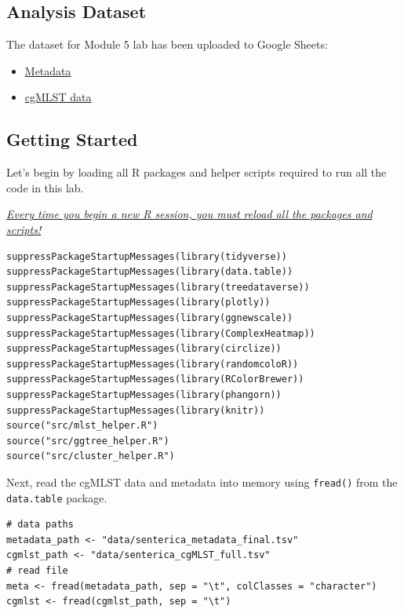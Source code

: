 \documentclass[
]{book}
\providecommand{\tightlist}{%
  \setlength{\itemsep}{0pt}\setlength{\parskip}{0pt}}
\begin{document}
\subsection{Analysis Dataset}\label{analysis-dataset}

The dataset for Module 5 lab has been uploaded to Google Sheets:

\begin{itemize}
\tightlist
\item
  \href{https://docs.google.com/spreadsheets/d/12gvH6U5pwj8QK-Ui3lOIYOm_X-69A2IE0cbctaEzY5E/edit?usp=sharing\#gid=1448009352}{Metadata}
\item
  \href{https://docs.google.com/spreadsheets/d/12gvH6U5pwj8QK-Ui3lOIYOm_X-69A2IE0cbctaEzY5E/edit?usp=sharing\#gid=8240612}{cgMLST data}
\end{itemize}

\subsection{Getting Started}\label{getting-started}

Let's begin by loading all R packages and helper scripts required to run all the code in this lab.

\emph{\ul{Every time you begin a new R session, you must reload all the packages and scripts!}}

\begin{verbatim}
suppressPackageStartupMessages(library(tidyverse))
suppressPackageStartupMessages(library(data.table))
suppressPackageStartupMessages(library(treedataverse))
suppressPackageStartupMessages(library(plotly))
suppressPackageStartupMessages(library(ggnewscale))
suppressPackageStartupMessages(library(ComplexHeatmap))
suppressPackageStartupMessages(library(circlize))
suppressPackageStartupMessages(library(randomcoloR))
suppressPackageStartupMessages(library(RColorBrewer))
suppressPackageStartupMessages(library(phangorn))
suppressPackageStartupMessages(library(knitr))
source("src/mlst_helper.R")
source("src/ggtree_helper.R")
source("src/cluster_helper.R")
\end{verbatim}

Next, read the cgMLST data and metadata into memory using \texttt{fread()} from the \texttt{data.table} package.

\begin{verbatim}
# data paths
metadata_path <- "data/senterica_metadata_final.tsv"
cgmlst_path <- "data/senterica_cgMLST_full.tsv"
# read file
meta <- fread(metadata_path, sep = "\t", colClasses = "character")
cgmlst <- fread(cgmlst_path, sep = "\t")
\end{verbatim}
\end{document}
